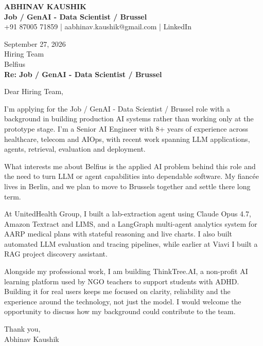 \documentclass[10pt,a4paper]{article}
\begin{document}
\begin{center}
{\Large\bfseries ABHINAV KAUSHIK}\\[2pt]
{\bfseries Job / GenAI - Data Scientist / Brussel}\\[2pt]
+91 87005 71859 \quad | \quad aabhinav.kaushik@gmail.com \quad | \quad LinkedIn
\end{center}
\vspace{8pt}
September 27, 2026\\[6pt]
Hiring Team\\
Belfius\\[4pt]
\textbf{Re: Job / GenAI - Data Scientist / Brussel}

Dear Hiring Team,

I’m applying for the Job / GenAI - Data Scientist / Brussel role with a background in building production AI systems rather than working only at the prototype stage. I’m a Senior AI Engineer with 8+ years of experience across healthcare, telecom and AIOps, with recent work spanning LLM applications, agents, retrieval, evaluation and deployment.

What interests me about Belfius is the applied AI problem behind this role and the need to turn LLM or agent capabilities into dependable software. My fiancée lives in Berlin, and we plan to move to Brussels together and settle there long term.

At UnitedHealth Group, I built a lab-extraction agent using Claude Opus 4.7, Amazon Textract and LIMS, and a LangGraph multi-agent analytics system for AARP medical plans with stateful reasoning and live charts. I also built automated LLM evaluation and tracing pipelines, while earlier at Viavi I built a RAG project discovery assistant.

Alongside my professional work, I am building ThinkTree.AI, a non-profit AI learning platform used by NGO teachers to support students with ADHD. Building it for real users keeps me focused on clarity, reliability and the experience around the technology, not just the model. I would welcome the opportunity to discuss how my background could contribute to the team.

Thank you,\\
Abhinav Kaushik
\end{document}
